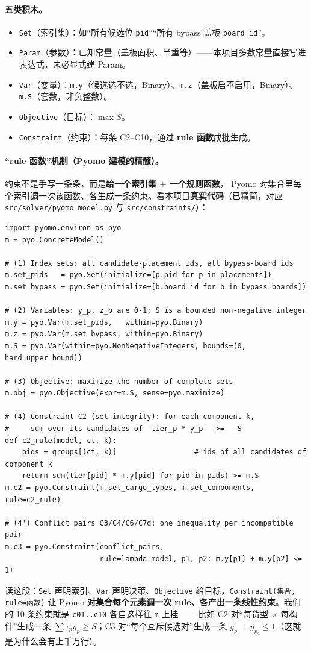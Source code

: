 \documentclass[11pt]{ctexart}
\newcommand{\code}[1]{\texttt{#1}}
\begin{document}
\paragraph{五类积木。}
\begin{itemize}[leftmargin=1.8em,itemsep=1pt]
  \item \code{Set}（索引集）：如“所有候选位 \code{pid}”“所有 bypass 盖板 \code{board\_id}”。
  \item \code{Param}（参数）：已知常量（盖板面积、半重等）——本项目多数常量直接写进表达式，未必显式建 Param。
  \item \code{Var}（变量）：\code{m.y}（候选选不选，Binary）、\code{m.z}（盖板启不启用，Binary）、\code{m.S}（套数，非负整数）。
  \item \code{Objective}（目标）：$\max S$。
  \item \code{Constraint}（约束）：每条 C2--C10，通过 \textbf{rule 函数}成批生成。
\end{itemize}
\paragraph{“rule 函数”机制（Pyomo 建模的精髓）。}约束不是手写一条条，而是\textbf{给一个索引集 $+$ 一个规则函数}，
Pyomo 对集合里每个索引调一次该函数、各生成一条约束。看本项目\textbf{真实代码}（已精简，对应 \code{src/solver/pyomo\_model.py} 与 \code{src/constraints/}）：
\begin{lstlisting}[style=codebox]
import pyomo.environ as pyo
m = pyo.ConcreteModel()

# (1) Index sets: all candidate-placement ids, all bypass-board ids
m.set_pids   = pyo.Set(initialize=[p.pid for p in placements])
m.set_bypass = pyo.Set(initialize=[b.board_id for b in bypass_boards])

# (2) Variables: y_p, z_b are 0-1; S is a bounded non-negative integer
m.y = pyo.Var(m.set_pids,   within=pyo.Binary)
m.z = pyo.Var(m.set_bypass, within=pyo.Binary)
m.S = pyo.Var(within=pyo.NonNegativeIntegers, bounds=(0, hard_upper_bound))

# (3) Objective: maximize the number of complete sets
m.obj = pyo.Objective(expr=m.S, sense=pyo.maximize)

# (4) Constraint C2 (set integrity): for each component k,
#     sum over its candidates of  tier_p * y_p   >=   S
def c2_rule(model, ct, k):
    pids = groups[(ct, k)]                  # ids of all candidates of component k
    return sum(tier[pid] * m.y[pid] for pid in pids) >= m.S
m.c2 = pyo.Constraint(m.set_cargo_types, m.set_components, rule=c2_rule)

# (4') Conflict pairs C3/C4/C6/C7d: one inequality per incompatible pair
m.c3 = pyo.Constraint(conflict_pairs,
                      rule=lambda model, p1, p2: m.y[p1] + m.y[p2] <= 1)
\end{lstlisting}
读这段：\code{Set} 声明索引、\code{Var} 声明决策、\code{Objective} 给目标，\code{Constraint(集合, rule=函数)}
让 Pyomo \textbf{对集合每个元素调一次 rule、各产出一条线性约束}。我们的 10 条约束就是 \code{c01..c10} 各自这样往 \code{m} 上挂——
比如 C2 对“每货型 $\times$ 每构件”生成一条 $\sum\tau_p y_p\ge S$；C3 对“每个互斥候选对”生成一条 $y_{p_1}+y_{p_2}\le1$（这就是为什么会有上千万行）。
\end{document}
